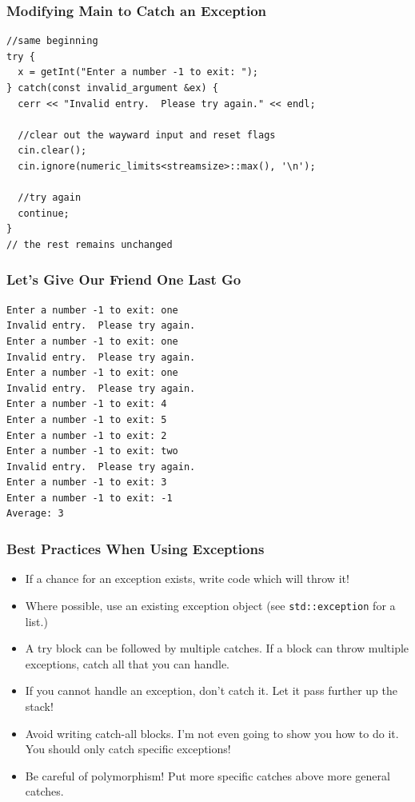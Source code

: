\documentclass{beamer}
\begin{document}
\begin{frame}[fragile]
    \frametitle{Modifying Main to Catch an Exception}
    {\small
    \begin{verbatim}
//same beginning
try {
  x = getInt("Enter a number -1 to exit: ");
} catch(const invalid_argument &ex) {
  cerr << "Invalid entry.  Please try again." << endl;
    
  //clear out the wayward input and reset flags
  cin.clear();
  cin.ignore(numeric_limits<streamsize>::max(), '\n');
    
  //try again
  continue;
}
// the rest remains unchanged
    \end{verbatim}
}
\end{frame}

\begin{frame}[fragile]
    \frametitle{Let's Give Our Friend One Last Go}
    \begin{verbatim}
Enter a number -1 to exit: one
Invalid entry.  Please try again.
Enter a number -1 to exit: one
Invalid entry.  Please try again.
Enter a number -1 to exit: one
Invalid entry.  Please try again.
Enter a number -1 to exit: 4
Enter a number -1 to exit: 5
Enter a number -1 to exit: 2
Enter a number -1 to exit: two
Invalid entry.  Please try again.
Enter a number -1 to exit: 3
Enter a number -1 to exit: -1
Average: 3
    \end{verbatim}
\end{frame}

\begin{frame}
    \frametitle{Best Practices When Using Exceptions}
    \begin{itemize}[<+->]
        \item If a chance for an exception exists, write code which will throw it!
        \item Where possible, use an existing exception object (see {\tt std::exception} for a list.)
        \item A try block can be followed by multiple catches.  If a block can throw multiple exceptions, catch all that you can handle.
        \item If you cannot handle an exception, don't catch it.  Let it pass further up the stack!
        \item Avoid writing catch-all blocks.  I'm not even going to show you how to do it.  You should only catch specific exceptions!
        \item Be careful of polymorphism!  Put more specific catches above more general catches.
    \end{itemize}
\end{frame}
\end{document}
